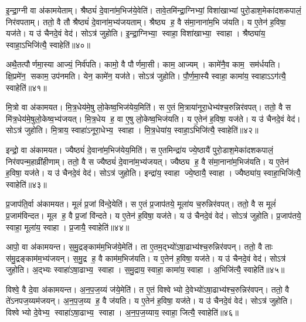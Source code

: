 इ॒न्द्रा॒ग्नी वा अ॑कामयेताम्।
श्रैष्ठ्यं॑ दे॒वाना॑म॒भिज॑ये॒वेति॑।
तावे॒तमि॑न्द्रा॒ग्निभ्यां॒ विशा॑खाभ्यां पुरो॒डाश॒मेका॑दशकपालं॒ निर॑वपताम्।
ततो॒ वै तौ श्रैष्ठ्यं॑ दे॒वाना॑म॒भ्य॑जयताम्।
श्रैष्ठ्य ह॒ वै स॑मा॒नाना॑म॒भि ज॑यति।
य ए॒तेन॑ ह॒विषा॒ यज॑ते।
य उ॑ चैनदे॒वं वेद॑।
सोऽत्र॑ जुहोति।
इ॒न्द्रा॒ग्निभ्या॒ स्वाहा॒ विशा॑खाभ्या॒ स्वाहा।
श्रैष्ठ्या॑य॒ स्वाहा॒ऽभिजि॑त्यै॒ स्वाहेति॑॥४०॥

अथै॒तत्पौर्णमा॒स्या आज्यं॒ निर्व॑पति।
कामो॒ वै पौर्णमा॒सी।
काम॒ आज्यम्।
कामे॑नै॒व काम॒ सम॑र्धयति।
क्षि॒प्रमे॑न॒ सकाम॒ उप॑नमति।
येन॒ कामे॑न॒ यज॑ते।
सोऽत्र॑ जुहोति।
पौ॒र्ण॒मा॒स्यै स्वाहा॒ कामा॑य॒ स्वाहाऽऽग॑त्यै॒ स्वाहेति॑॥४१॥\anuvakamend[अ॒ग्निः पञ्च॑दश प्र॒जाप॑ति॒ष्षोड॑श॒ सोम॒ एका॑दश रु॒द्रो दश॒र्क्षैका॑दश॒ बृह॒स्पति॒र्दश॑ देवासु॒रा नव॑ पि॒तर॒ एका॑दशार्य॒मा भगो॒ दश॑ दश सवि॒ता चतु॑र्दश॒ त्वष्टा॑ वा॒युरि॑न्द्रा॒ग्नी दश॑ द॒शाथै॒तत्पौर्णमा॒स्या अ॒ष्टौ पञ्च॑दश]

मि॒त्रो वा अ॑कामयत।
मि॒त्र॒धेय॑मे॒षु लो॒केष्व॒भिज॑येय॒मिति॑।
स ए॒तं मि॒त्राया॑नूरा॒धेभ्य॑श्च॒रुन्निर॑वपत्।
ततो॒ वै स मि॑त्र॒धेय॑मे॒षुलो॒केष्व॒भ्य॑जयत्।
मि॒त्र॒धेय ह॒ वा ए॒षु लो॒केष्व॒भिज॑यति।
य ए॒तेन॑ ह॒विषा॒ यज॑ते।
य उ॑ चैनदे॒वं वेद॑।
सोऽत्र॑ जुहोति।
मि॒त्राय॒ स्वाहा॑ऽनूरा॒धेभ्य॒ स्वाहा।
मि॒त्र॒धेया॑य॒ स्वाहा॒ऽभिजि॑त्यै॒ स्वाहेति॑॥४२॥

इन्द्रो॒ वा अ॑कामयत।
ज्यैष्ठ्यं॑ दे॒वाना॑म॒भिज॑येय॒मिति॑।
स ए॒तमिन्द्रा॑य ज्ये॒ष्ठायै॑ पुरो॒डाश॒मेका॑दशकपालं॒ निर॑वपन्म॒हाव्री॑हीणाम्।
ततो॒ वै स ज्यैष्ठ्यं॑ दे॒वाना॑म॒भ्य॑जयत्।
ज्यैष्ठ्य ह॒ वै स॑मा॒नाना॑म॒भिज॑यति।
य ए॒तेन॑ ह॒विषा॒ यज॑ते।
य उ॑ चैनदे॒वं वेद॑।
सोऽत्र॑ जुहोति।
इन्द्रा॑य॒ स्वाहा ज्ये॒ष्ठायै॒ स्वाहा।
ज्यैष्ठ्या॑य॒ स्वाहा॒भिजि॑त्यै॒ स्वाहेति॑॥४३॥

प्र॒जाप॑ति॒र्वा अ॑कामयत।
मूलं॑ प्र॒जां वि॑न्दे॒येति॑।
स ए॒तं प्र॒जाप॑तये॒ मूला॑य च॒रुन्निर॑वपत्।
ततो॒ वै स मूलं॑ प्र॒जाम॑विन्दत।
मूल ह॒ वै प्र॒जां वि॑न्दते।
य ए॒तेन॑ ह॒विषा॒ यज॑ते।
य उ॑ चैनदे॒वं वेद॑।
सोऽत्र॑ जुहोति।
प्र॒जाप॑तये॒ स्वाहा॒ मूला॑य॒ स्वाहा।
प्र॒जायै॒ स्वाहेति॑॥४४॥

आपो॒ वा अ॑कामयन्त।
स॒मु॒द्रङ्काम॑म॒भिज॑ये॒मेति॑।
ता ए॒तम॒द्भ्यो॑ऽषा॒ढाभ्य॑श्च॒रुन्निर॑वपन्।
ततो॒ वै ताः स॑मु॒द्रङ्काम॑म॒भ्य॑जयन्।
स॒मु॒द्र ह॒ वै काम॑म॒भिज॑यति।
य ए॒तेन॑ ह॒विषा॒ यज॑ते।
य उ॑ चैनदे॒वं वेद॑।
सोऽत्र॑ जुहोति।
अ॒द्भ्यः स्वाहा॑ऽषा॒ढाभ्य॒ स्वाहा।
स॒मु॒द्राय॒ स्वाहा॒ कामा॑य॒ स्वाहा।
अ॒भिजि॑त्यै॒ स्वाहेति॑॥४५॥

विश्वे॒ वै दे॒वा अ॑कामयन्त।
अ॒न॒प॒ज॒य्यं ज॑ये॒मेति॑।
त ए॒तं विश्वेभ्यो दे॒वेभ्यो॑ऽषा॒ढाभ्य॑श्च॒रुन्निर॑वपन्।
ततो॒ वै ते॑ऽनपज॒य्यम॑जयन्।
अ॒न॒प॒ज॒य्य ह॒ वै ज॑यति।
य ए॒तेन॑ ह॒विषा॒ यज॑ते।
य उ॑ चैनदे॒वं वेद॑।
सोऽत्र॑ जुहोति।
विश्वेभ्यो दे॒वेभ्य॒ स्वाहा॑ऽषा॒ढाभ्य॒ स्वाहा।
अ॒न॒प॒ज॒य्याय॒ स्वाहा॒ जित्यै॒ स्वाहेति॑॥४६॥

